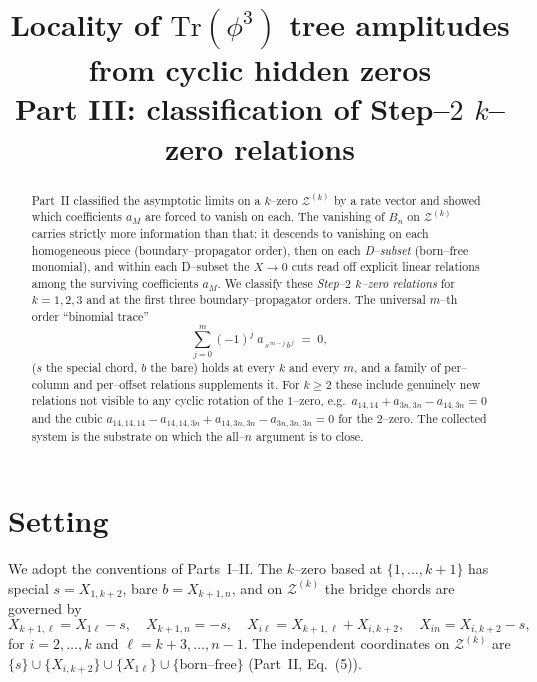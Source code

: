 \documentclass[11pt]{article}
\title{\vspace{-1.2em}Locality of $\mathrm{Tr}(\phi^3)$ tree amplitudes from cyclic hidden zeros\\[2pt]
\large Part III: classification of Step--$2$ $k$--zero relations}
\date{}
\author{}
\theoremstyle{definition}
\newcommand{\Z}{\mathcal{Z}}
\newcommand{\X}[1]{X_{#1}}
\begin{document}
\maketitle
\vspace{-3.2em}

\begin{abstract}
\noindent Part~II classified the asymptotic limits on a $k$--zero $\Z^{(k)}$ by a rate vector and
showed which coefficients $a_M$ are forced to vanish on each. The vanishing of $B_n$ on
$\Z^{(k)}$ carries strictly more information than that: it descends to vanishing on each homogeneous
piece (boundary--propagator order), then on each \emph{D--subset} (born--free monomial), and within
each D--subset the $X\!\to\!0$ cuts read off explicit linear relations among the surviving
coefficients $a_M$. We classify these \emph{Step--$2$ $k$--zero relations} for $k=1,2,3$ and at the
first three boundary--propagator orders. The universal $m$--th order ``binomial trace''
\begin{equation*}
  \sum_{j=0}^{m}(-1)^{j}\;a_{\,s^{\,m-j}\,b^{\,j}}\;=\;0,
\end{equation*}
($s$ the special chord, $b$ the bare) holds at every $k$ and every $m$, and a family of per--column
and per--offset relations supplements it. For $k\ge2$ these include genuinely new relations not
visible to any cyclic rotation of the $1$--zero, e.g.\ $a_{14,14}+a_{3n,3n}-a_{14,3n}=0$ and the
cubic $a_{14,14,14}-a_{14,14,3n}+a_{14,3n,3n}-a_{3n,3n,3n}=0$ for the $2$--zero. The collected
system is the substrate on which the all--$n$ argument is to close.
\end{abstract}

\section{Setting}
We adopt the conventions of Parts~I--II. The $k$--zero based at $\{1,\dots,k{+}1\}$ has special
$s=\X{1,k+2}$, bare $b=\X{k+1,n}$, and on $\Z^{(k)}$ the bridge chords are governed by
\begin{equation}\label{eq:constr}
  \X{k+1,\ell}=\X{1\ell}-s,\quad \X{k+1,n}=-s,\quad
  \X{i\ell}=\X{k+1,\ell}+\X{i,k+2},\quad \X{in}=\X{i,k+2}-s,
\end{equation}
for $i=2,\dots,k$ and $\ell=k{+}3,\dots,n{-}1$. The independent coordinates on $\Z^{(k)}$ are
$\{s\}\cup\{\X{i,k+2}\}\cup\{\X{1\ell}\}\cup\{\text{born--free}\}$ (Part~II, Eq.~(5)).
\end{document}
